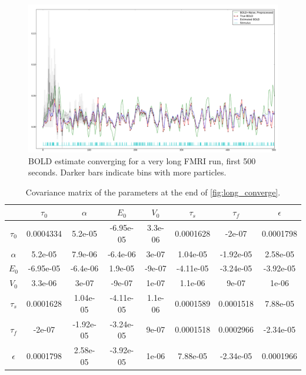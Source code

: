 \begin{figure}
\centering
\includegraphics[clip=true,trim=1cm 0cm 0cm 0cm, width=17cm]{images/long_converge_500}
\caption{BOLD estimate converging for a very long FMRI run, first 500 seconds. Darker bars
indicate bins with more particles.}
\label{fig:long_converge_500}
\end{figure}

\begin{table}[t]
\begin{tabular}{|c | c  c  c  c  c  c  c |}
\hline 
  & $\tau_0$ & $\alpha$ & $E_0$    & $V_0$    & $\tau_s$ & $\tau_f$ & $\epsilon$ \\
\hline 
\rowcolor[gray]{.8} $\tau_0$  & 0.0004334 & 5.2e-05 & -6.95e-05 & 3.3e-06 & 0.0001628 & -2e-07 & 0.0001798 \\
$\alpha$                      & 5.2e-05 & 7.9e-06 & -6.4e-06 & 3e-07 & 1.04e-05 & -1.92e-05 & 2.58e-05 \\
\rowcolor[gray]{.8} $E_0$     & -6.95e-05 & -6.4e-06 & 1.9e-05 & -9e-07 & -4.11e-05 & -3.24e-05 & -3.92e-05 \\
$V_0$                         & 3.3e-06 & 3e-07 & -9e-07 & 1e-07 & 1.1e-06 & 9e-07 & 1e-06 \\
\rowcolor[gray]{.8} $\tau_s$  & 0.0001628 & 1.04e-05 & -4.11e-05 & 1.1e-06 & 0.0001589 & 0.0001518 & 7.88e-05 \\
$\tau_f$                      & -2e-07 & -1.92e-05 & -3.24e-05 & 9e-07 & 0.0001518 & 0.0002966 & -2.34e-05 \\
\rowcolor[gray]{.8} $\epsilon$& 0.0001798 & 2.58e-05 & -3.92e-05 & 1e-06 & 7.88e-05 & -2.34e-05 & 0.0001966 \\
\hline 
\end{tabular}
\caption{Covariance matrix of the parameters at the end of \autoref{fig:long_converge}.}
\label{tab:long_cov} 
\end{table}

